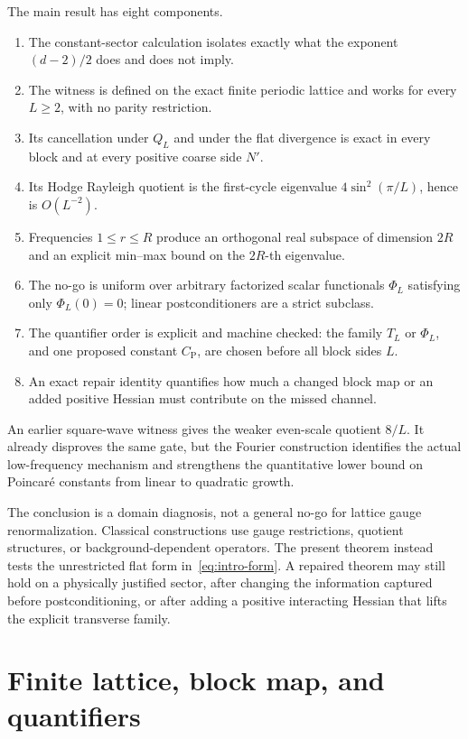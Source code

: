 \documentclass[11pt]{article}
\theoremstyle{definition}
\newcommand{\CP}{C_{\mathrm P}}
\begin{document}
The main result has eight components.
\begin{enumerate}[label=(\roman*)]
\item The constant-sector calculation isolates exactly what the exponent
  $(d-2)/2$ does and does not imply.
\item The witness is defined on the exact finite periodic lattice and works
  for every $L\ge2$, with no parity restriction.
\item Its cancellation under $Q_L$ and under the flat divergence is exact in
  every block and at every positive coarse side $N'$.
\item Its Hodge Rayleigh quotient is the first-cycle eigenvalue
  $4\sin^2(\pi/L)$, hence is $O(L^{-2})$.
\item Frequencies $1\le r\le R$ produce an orthogonal real subspace of
  dimension $2R$ and an explicit min--max bound on the $2R$-th eigenvalue.
\item The no-go is uniform over arbitrary factorized scalar functionals
  $\Phi_L$ satisfying only $\Phi_L(0)=0$; linear postconditioners are a strict
  subclass.
\item The quantifier order is explicit and machine checked: the family $T_L$
  or $\Phi_L$, and one proposed constant $\CP$, are chosen before all block
  sides $L$.
\item An exact repair identity quantifies how much a changed block map or an
  added positive Hessian must contribute on the missed channel.
\end{enumerate}

An earlier square-wave witness gives the weaker even-scale quotient $8/L$.
It already disproves the same gate, but the Fourier construction identifies
the actual low-frequency mechanism and strengthens the quantitative lower
bound on Poincar\'e constants from linear to quadratic growth.

The conclusion is a domain diagnosis, not a general no-go for lattice gauge
renormalization.  Classical constructions use gauge restrictions, quotient
structures, or background-dependent operators.  The present theorem instead
tests the unrestricted flat form in~\eqref{eq:intro-form}.  A repaired theorem
may still hold on a physically justified sector, after changing the
information captured before postconditioning, or after adding a positive
interacting Hessian that lifts the explicit transverse family.

\section{Finite lattice, block map, and quantifiers}
\end{document}
